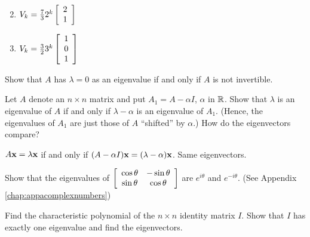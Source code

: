 \begin{multicols}{2}
\begin{ex}
\begin{enumerate}[label={\alph*.}]
\end{enumerate}
\begin{sol}
\begin{enumerate}[label={\alph*.}]
\setcounter{enumi}{1}
\item  $V_k = \tfrac{7}{3} 2^k  \left[ \begin{array}{r}
2 \\
1
\end{array}\right]$


\setcounter{enumi}{3}
\item  $V_k = \tfrac{3}{2} 3^k  \left[ \begin{array}{r}
1 \\
0 \\
1
\end{array}\right]$


\end{enumerate}
\end{sol}
\end{ex}

\begin{ex}
Show that $A$ has $\lambda = 0$ as an eigenvalue if and only if $A$ is not invertible.
\end{ex}

\begin{ex}
Let $A$ denote an $n \times n$ matrix and put $A_{1} = A - \alpha I$, $\alpha$ in $\mathbb{R}$. Show that $\lambda$ is an eigenvalue of $A$ if and only if $\lambda -\alpha$ is an eigenvalue of $A_{1}$. (Hence, the eigenvalues of $A_{1}$ are just those of $A$ ``shifted'' by $\alpha$.) How do the eigenvectors compare?

\begin{sol}
$A\textbf{x} = \lambda\textbf{x}$ if and only if $(A - \alpha I)\textbf{x} = (\lambda -  \alpha)\textbf{x}$. Same eigenvectors.
\end{sol}
\end{ex}

\begin{ex}
Show that the eigenvalues of $\left[ \begin{array}{cc}
\cos \theta & -\sin \theta \\
\sin \theta & \cos \theta 
\end{array} \right]$ 
 are $e^{i\theta}$ and $e^{-i\theta}$. \newline (See Appendix \ref{chap:appacomplexnumbers})
\end{ex}

\begin{ex}
Find the characteristic polynomial of the $n \times n$ identity matrix $I$. Show that $I$ has exactly one eigenvalue and find the eigenvectors.
\end{ex}


\end{multicols}
